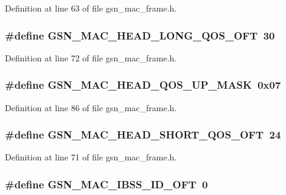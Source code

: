 Definition at line 63 of file gsn\_\-mac\_\-frame.h.

\hypertarget{a00523_a5f0e7eddb2d618ddeb6cb1427232ac34}{
\subsubsection[{GSN\_\-MAC\_\-HEAD\_\-LONG\_\-QOS\_\-OFT}]{\setlength{\rightskip}{0pt plus 5cm}\#define GSN\_\-MAC\_\-HEAD\_\-LONG\_\-QOS\_\-OFT~30}}
\label{a00523_a5f0e7eddb2d618ddeb6cb1427232ac34}


Definition at line 72 of file gsn\_\-mac\_\-frame.h.

\hypertarget{a00523_a7c16158025b53bfe87f59c9b386bf2d8}{
\subsubsection[{GSN\_\-MAC\_\-HEAD\_\-QOS\_\-UP\_\-MASK}]{\setlength{\rightskip}{0pt plus 5cm}\#define GSN\_\-MAC\_\-HEAD\_\-QOS\_\-UP\_\-MASK~0x07}}
\label{a00523_a7c16158025b53bfe87f59c9b386bf2d8}


Definition at line 86 of file gsn\_\-mac\_\-frame.h.

\hypertarget{a00523_af5a16fe59ad1e18bcd246b1fc6f9ed53}{
\subsubsection[{GSN\_\-MAC\_\-HEAD\_\-SHORT\_\-QOS\_\-OFT}]{\setlength{\rightskip}{0pt plus 5cm}\#define GSN\_\-MAC\_\-HEAD\_\-SHORT\_\-QOS\_\-OFT~24}}
\label{a00523_af5a16fe59ad1e18bcd246b1fc6f9ed53}


Definition at line 71 of file gsn\_\-mac\_\-frame.h.

\hypertarget{a00523_a48110085a66cecc8ed7433f7dab46f1b}{
\subsubsection[{GSN\_\-MAC\_\-IBSS\_\-ID\_\-OFT}]{\setlength{\rightskip}{0pt plus 5cm}\#define GSN\_\-MAC\_\-IBSS\_\-ID\_\-OFT~0}}
\label{a00523_a48110085a66cecc8ed7433f7dab46f1b}


